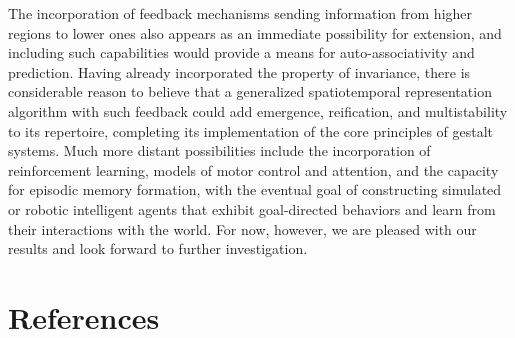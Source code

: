 \documentclass[a4paper,10pt]{article}
\begin{document}
The incorporation of feedback mechanisms sending information from higher regions to lower ones also
appears as an immediate possibility for extension, and including such capabilities would provide a
means for auto-associativity and prediction.\cite{HTMAlgo, OnIntelligence} Having already
incorporated the property of invariance, there is considerable reason to believe that a generalized
spatiotemporal representation algorithm with such feedback could add emergence, reification, and
multistability to its repertoire, completing its implementation of the core principles of gestalt
systems.\cite{HTMAlgo, OnIntelligence} Much more distant possibilities include the incorporation of
reinforcement learning, models of motor control and attention, and the capacity for episodic memory
formation, with the eventual goal of constructing simulated or robotic intelligent agents that
exhibit goal-directed behaviors and learn from their interactions with the
world.\cite{OnIntelligence} For now, however, we are pleased with our results and look forward to
further investigation.

\section{References}
\end{document}
